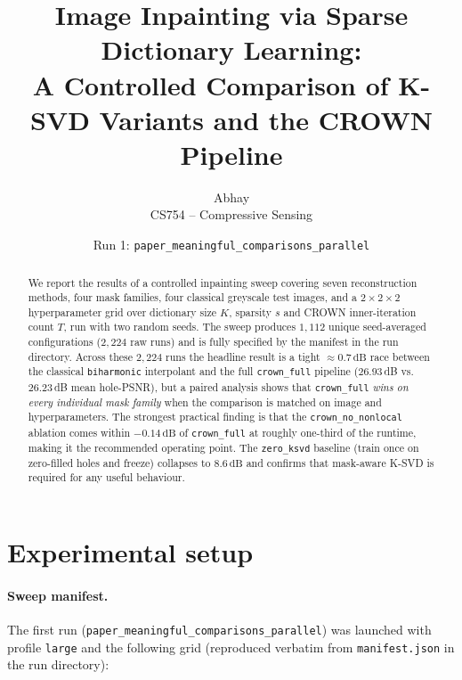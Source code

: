 \documentclass[11pt,a4paper]{article}
\title{\textbf{Image Inpainting via Sparse Dictionary Learning:\\
A Controlled Comparison of K-SVD Variants and the CROWN Pipeline}}
\author{Abhay\\\small CS754 -- Compressive Sensing}
\date{Run 1: \texttt{paper\_meaningful\_comparisons\_parallel}}
\newcommand{\method}[1]{\texttt{#1}}
\newcommand{\dB}{\,\textrm{dB}}
\begin{document}
\maketitle

\begin{abstract}
We report the results of a controlled inpainting sweep covering
seven reconstruction methods, four mask families, four classical
greyscale test images, and a $2{\times}2{\times}2$ hyperparameter grid
over dictionary size $K$, sparsity $s$ and CROWN inner-iteration count
$T$, run with two random seeds. The sweep produces $1{,}112$ unique
seed-averaged configurations ($2{,}224$ raw runs) and is fully
specified by the manifest in the run directory. Across these
$2{,}224$ runs the headline result is a tight $\approx0.7\dB$
race between the classical \method{biharmonic} interpolant and the
full \method{crown\_full} pipeline ($26.93$\dB{} vs.\ $26.23$\dB{}
mean hole-PSNR), but a paired analysis shows that
\method{crown\_full} \emph{wins on every individual mask family}
when the comparison is matched on image and hyperparameters.
The strongest practical finding is that the
\method{crown\_no\_nonlocal} ablation comes within $-0.14\dB$ of
\method{crown\_full} at roughly one-third of the runtime, making it
the recommended operating point. The \method{zero\_ksvd} baseline
(train once on zero-filled holes and freeze) collapses to
$8.6\dB$ and confirms that mask-aware K-SVD is required for any
useful behaviour.
\end{abstract}

\section{Experimental setup}\label{sec:setup}

\paragraph{Sweep manifest.}
The first run (\texttt{paper\_meaningful\_comparisons\_parallel}) was
launched with profile \texttt{large} and the following grid
(reproduced verbatim from \texttt{manifest.json} in the run
directory):
\end{document}
